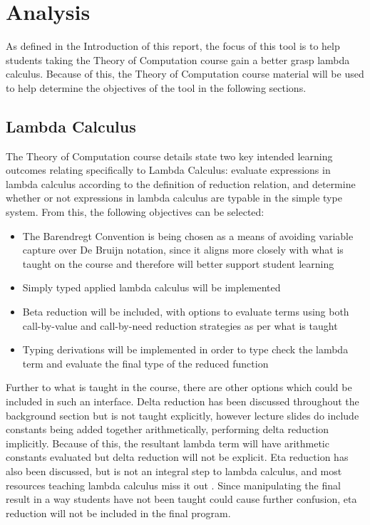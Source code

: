 \documentclass[a4paper,11pt]{report}
\begin{document}
\renewcommand{\cleardoublepage}{}
\renewcommand{\clearpage}{}
\chapter{Analysis}
As defined in the Introduction of this report, the focus of this tool is to help students taking the Theory of Computation course gain a better grasp lambda calculus. Because of this, the Theory of Computation course material will be used to help determine the objectives of the tool in the following sections.

\section{Lambda Calculus}
The Theory of Computation course details \cite{CourseSpecification} state two key intended learning outcomes relating specifically to Lambda Calculus: evaluate expressions in lambda calculus according to the definition of reduction relation, and determine whether or not expressions in lambda calculus are typable in the simple type system. From this, the following objectives can be selected:

\begin{itemize}
	\item The Barendregt Convention is being chosen as a means of avoiding variable capture over De Bruijn notation, since it aligns more closely with what is taught on the course and therefore will better support student learning
	\item Simply typed applied lambda calculus will be implemented
	\item Beta reduction will be included, with options to evaluate terms using both call-by-value and call-by-need reduction strategies as per what is taught
	\item Typing derivations will be implemented in order to type check the lambda term and evaluate the final type of the reduced function
\end{itemize}

Further to what is taught in the course, there are other options which could be included in such an interface.  Delta reduction has been discussed throughout the background section but is not taught explicitly, however lecture slides do include constants being added together arithmetically, performing delta reduction implicitly. Because of this, the resultant lambda term will have arithmetic constants evaluated but delta reduction will not be explicit. Eta reduction has also been discussed, but is not an integral step to lambda calculus, and most resources teaching lambda calculus miss it out \cite{Acar2008} \cite{Barendregt2000} \cite{Gay2019} \cite{Horowitz2013} \cite{Rojas1998} \cite{Hankin2004}. Since manipulating the final result in a way students have not been taught could cause further confusion, eta reduction will not be included in the final program.
\end{document}
